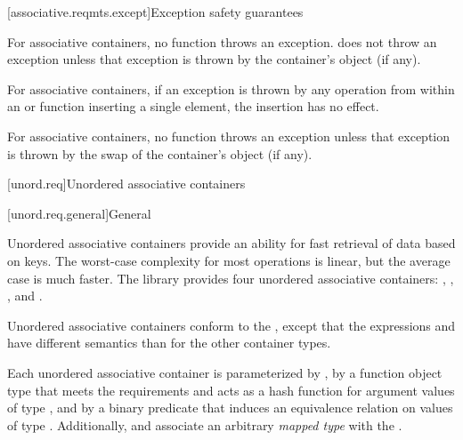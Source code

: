 [associative.reqmts.except]{Exception safety guarantees}%
%
%

\pnum
For associative containers, no  function throws an exception.
 does not throw an exception unless that exception is thrown
by the container's  object (if any).

\pnum
For associative containers, if an exception is thrown by any operation from
within an  or  function inserting a single element, the
insertion has no effect.

\pnum
For associative containers, no  function throws an exception unless
that exception is thrown by the
swap of the container's  object (if any).

[unord.req]{Unordered associative containers}%

[unord.req.general]{General}

\pnum
{}%
Unordered associative containers provide an ability for fast retrieval
of data based on keys.  The worst-case complexity for most operations
is linear, but the average case is much faster.  The library provides
four unordered associative containers: ,
, , and
.

\pnum
{}%
%
%
Unordered associative containers conform to the , except that
the expressions
 and  have different semantics than for the other
container types.

\pnum
Each unordered associative container is parameterized by ,
by a function object type  that meets the 
requirements and acts as a hash function for
argument values of type , and by a binary predicate 
that induces an equivalence relation on values of type .
Additionally,  and  associate
an arbitrary \textit{mapped type}  with the .

